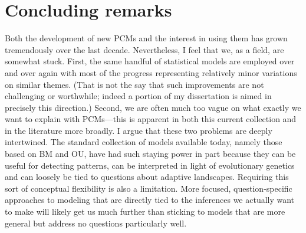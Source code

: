 \section{Concluding remarks}

Both the development of new PCMs and the interest in using them has grown tremendously over the last decade.  Nevertheless, I feel that we, as a field, are somewhat stuck. First, the same handful of statistical models are employed over and over again with most of the progress representing relatively minor variations on similar themes. (That is not the say that such improvements are not challenging or worthwhile; indeed a portion of my dissertation is aimed in precisely this direction.) Second, we are often much too vague on what exactly we want to explain with PCMs---this is apparent in both this current collection and in the literature more broadly. I argue that these two problems are deeply intertwined. The standard collection of models available today, namely those based on BM and OU, have had such staying power in part because they can be useful for detecting patterns, can be interpreted in light of evolutionary genetics and can loosely be tied to questions about adaptive landscapes. Requiring this sort of conceptual flexibility is also a limitation. More focused, question-specific approaches to modeling that are directly tied to the inferences we actually want to make will likely get us much further than sticking to models that are more general but address no questions particularly well.

 

   

